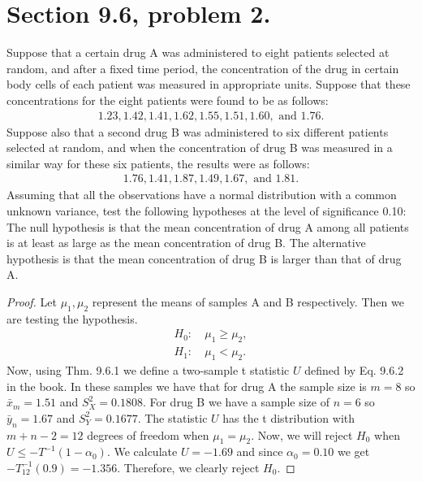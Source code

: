 \documentclass{article}
\newenvironment{hwproof}[1]
{
    #1
    \begin{proof}
}{
    \end{proof}
}
\begin{document}
\section{Section 9.6, problem 2.}
\begin{hwproof}
    {
        Suppose that a certain drug A was administered to eight patients selected at random,
        and after a fixed time period, the concentration of the drug in certain body
        cells of each patient was measured in appropriate units. Suppose that these
        concentrations for the eight patients were found to be as follows:
        \begin{gather*}
            1.23, 1.42, 1.41, 1.62, 1.55, 1.51, 1.60, \text{ and } 1.76.
        \end{gather*}
        Suppose also that a second drug B was administered to six different patients
        selected at random, and when the concentration of drug B was measured in a
        similar way for these six patients, the results were as follows:
        \begin{gather*}
            1.76, 1.41, 1.87, 1.49, 1.67, \text{ and } 1.81.
        \end{gather*}
        Assuming that all the observations have a normal distribution with a common
        unknown variance, test the following hypotheses at the level of significance
        0.10: The null hypothesis is that the mean concentration of drug A among
        all patients is at least as large as the mean concentration of drug B.
        The alternative hypothesis is that the mean concentration of drug B is larger
        than that of drug A.
    }
    Let $\mu_1, \mu_2$ represent the means of samples A and B respectively. Then
    we are testing the hypothesis.
    \begin{align*}
        H_0: & \ \mu_1 \geq \mu_2, \\
        H_1: & \ \mu_1 < \mu_2.
    \end{align*}
    Now, using Thm. 9.6.1 we define a two-sample t statistic $U$ defined by
    Eq. 9.6.2 in the book. In these samples we have that for drug A the sample size
    is $m = 8$ so $\bar{x}_m = 1.51$ and $S_X^2 = 0.1808$. For drug B we have a
    sample size of $n=6$ so $\bar{y}_n = 1.67$ and $S_Y^2 = 0.1677$. The
    statistic $U$ has the t distribution with $m + n -2 = 12$ degrees of freedom
    when $\mu_1 = \mu_2$. Now, we will reject $H_0$ when $U \leq -T^{-1}(1 - \alpha_0)$.
    We calculate $U = -1.69$ and since $\alpha_0 = 0.10$ we get
    $-T_{12}^{-1}(0.9) = -1.356$. Therefore, we clearly reject $H_0$.
\end{hwproof}
\end{document}
